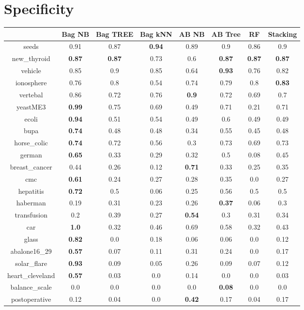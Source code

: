\documentclass{article}%
\begin{document}
%
\section*{Specificity}%
\begin{tabular}{c|ccccccc}%
&Bag NB&Bag TREE&Bag kNN&AB NB&AB Tree&RF&Stacking\\%
\hline%
seeds&0.91&0.87&\textbf{0.94}&0.89&0.9&0.86&0.9\\%
new\_thyroid&\textbf{0.87}&\textbf{0.87}&0.73&0.6&\textbf{0.87}&\textbf{0.87}&\textbf{0.87}\\%
vehicle&0.85&0.9&0.85&0.64&\textbf{0.93}&0.76&0.82\\%
ionosphere&0.76&0.8&0.54&0.74&0.79&0.8&\textbf{0.83}\\%
vertebal&0.86&0.72&0.76&\textbf{0.9}&0.72&0.69&0.7\\%
yeastME3&\textbf{0.99}&0.75&0.69&0.49&0.71&0.21&0.71\\%
ecoli&\textbf{0.94}&0.51&0.54&0.49&0.6&0.49&0.49\\%
bupa&\textbf{0.74}&0.48&0.48&0.34&0.55&0.45&0.48\\%
horse\_colic&\textbf{0.74}&0.72&0.56&0.3&0.73&0.69&0.73\\%
german&\textbf{0.65}&0.33&0.29&0.32&0.5&0.08&0.45\\%
breast\_cancer&0.44&0.26&0.12&\textbf{0.71}&0.33&0.25&0.35\\%
cmc&\textbf{0.61}&0.24&0.27&0.28&0.35&0.0&0.27\\%
hepatitis&\textbf{0.72}&0.5&0.06&0.25&0.56&0.5&0.5\\%
haberman&0.19&0.31&0.23&0.26&\textbf{0.37}&0.06&0.3\\%
transfusion&0.2&0.39&0.27&\textbf{0.54}&0.3&0.31&0.34\\%
car&\textbf{1.0}&0.32&0.46&0.69&0.58&0.32&0.43\\%
glass&\textbf{0.82}&0.0&0.18&0.06&0.06&0.0&0.12\\%
abalone16\_29&\textbf{0.57}&0.07&0.11&0.31&0.24&0.0&0.17\\%
solar\_flare&\textbf{0.93}&0.09&0.05&0.26&0.09&0.07&0.12\\%
heart\_cleveland&\textbf{0.57}&0.03&0.0&0.14&0.0&0.0&0.03\\%
balance\_scale&0.0&0.0&0.0&0.0&\textbf{0.08}&0.0&0.0\\%
postoperative&0.12&0.04&0.0&\textbf{0.42}&0.17&0.04&0.17\\%
\end{tabular}

%
\end{document}

